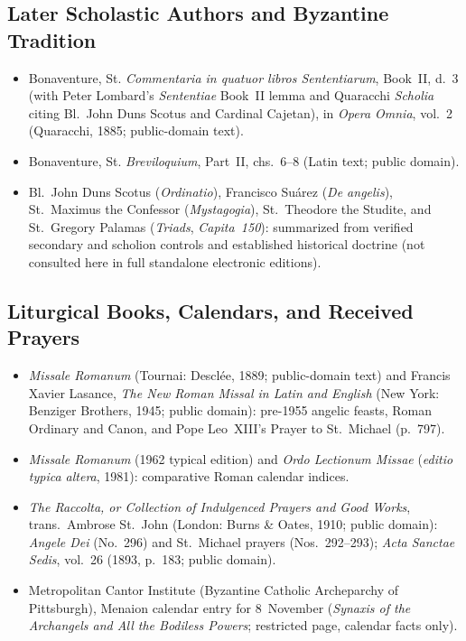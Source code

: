 \subsection{Later Scholastic Authors and Byzantine Tradition}
\begin{itemize}
\item Bonaventure, St. \emph{Commentaria in quatuor libros Sententiarum}, Book~II, d.~3 (with Peter Lombard's \emph{Sententiae} Book~II lemma and Quaracchi \emph{Scholia} citing Bl.~John Duns Scotus and Cardinal Cajetan), in \emph{Opera Omnia}, vol.~2 (Quaracchi, 1885; public-domain text).
\item Bonaventure, St. \emph{Breviloquium}, Part~II, chs.~6--8 (Latin text; public domain).
\item Bl.~John Duns Scotus (\emph{Ordinatio}), Francisco Su\'arez (\emph{De angelis}), St.~Maximus the Confessor (\emph{Mystagogia}), St.~Theodore the Studite, and St.~Gregory Palamas (\emph{Triads}, \emph{Capita~150}): summarized from verified secondary and scholion controls and established historical doctrine (not consulted here in full standalone electronic editions).
\end{itemize}

\subsection{Liturgical Books, Calendars, and Received Prayers}
\begin{itemize}
\item \emph{Missale Romanum} (Tournai: Descl\'ee, 1889; public-domain text) and Francis Xavier Lasance, \emph{The New Roman Missal in Latin and English} (New York: Benziger Brothers, 1945; public domain): pre-1955 angelic feasts, Roman Ordinary and Canon, and Pope Leo~XIII's Prayer to St.~Michael (p.~797).
\item \emph{Missale Romanum} (1962 typical edition) and \emph{Ordo Lectionum Missae} (\emph{editio typica altera}, 1981): comparative Roman calendar indices.
\item \emph{The Raccolta, or Collection of Indulgenced Prayers and Good Works}, trans.\ Ambrose St.~John (London: Burns \& Oates, 1910; public domain): \emph{Angele Dei} (No.~296) and St.~Michael prayers (Nos.~292--293); \emph{Acta Sanctae Sedis}, vol.~26 (1893, p.~183; public domain).
\item Metropolitan Cantor Institute (Byzantine Catholic Archeparchy of Pittsburgh), Menaion calendar entry for 8~November (\emph{Synaxis of the Archangels and All the Bodiless Powers}; restricted page, calendar facts only).
\end{itemize}

